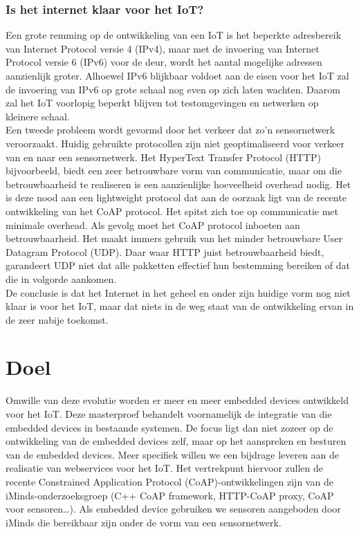 \subsubsection{Is het internet klaar voor het IoT?}
Een grote remming op de ontwikkeling van een IoT is het beperkte adresbereik van Internet Protocol versie 4 (IPv4), maar met de invoering van Internet Protocol versie 6 (IPv6) voor de deur, wordt het aantal mogelijke adressen aanzienlijk groter.
Alhoewel IPv6 blijkbaar voldoet aan de eisen voor het IoT zal de invoering van IPv6 op grote schaal nog even op zich laten wachten. Daarom zal het IoT voorlopig beperkt blijven tot testomgevingen en netwerken op kleinere schaal.\\
Een tweede probleem wordt gevormd door het verkeer dat zo'n sensornetwerk veroorzaakt. Huidig gebruikte protocollen zijn niet geoptimaliseerd voor verkeer van en naar een sensornetwerk. Het HyperText Transfer Protocol (HTTP) bijvoorbeeld, biedt een zeer betrouwbare vorm van communicatie, maar om die betrouwbaarheid te realiseren is een aanzienlijke hoeveelheid overhead nodig. Het is deze nood aan een lightweight protocol dat aan de oorzaak ligt van de recente ontwikkeling van het CoAP protocol. Het spitst zich toe op communicatie met minimale overhead. Als gevolg moet het CoAP protocol inboeten aan betrouwbaarheid. Het maakt immers gebruik van het minder betrouwbare User Datagram Protocol (UDP). Daar waar HTTP juist betrouwbaarheid biedt, garandeert UDP niet dat alle pakketten effectief hun bestemming bereiken of dat die in volgorde aankomen.\\
De conclusie is dat het Internet in het geheel en onder zijn huidige vorm nog niet klaar is voor het IoT, maar dat niets in de weg staat van de ontwikkeling ervan in de zeer nabije toekomst.

\section{Doel}

Omwille van deze evolutie worden er meer en meer embedded devices ontwikkeld voor het IoT. Deze masterproef behandelt voornamelijk de integratie van die embedded devices in bestaande systemen. De focus ligt dan niet zozeer op de ontwikkeling van de embedded devices zelf, maar op het aanspreken en besturen van de embedded devices. Meer specifiek willen we een bijdrage leveren aan de realisatie van webservices voor het IoT. Het vertrekpunt hiervoor zullen de recente Constrained Application Protocol (CoAP)-ontwikkelingen zijn van de iMinds-onderzoeksgroep (C++ CoAP framework, HTTP-CoAP proxy, CoAP voor sensoren…). Als embedded device gebruiken we sensoren aangeboden door iMinds die bereikbaar zijn onder de vorm van een sensornetwerk.\\

